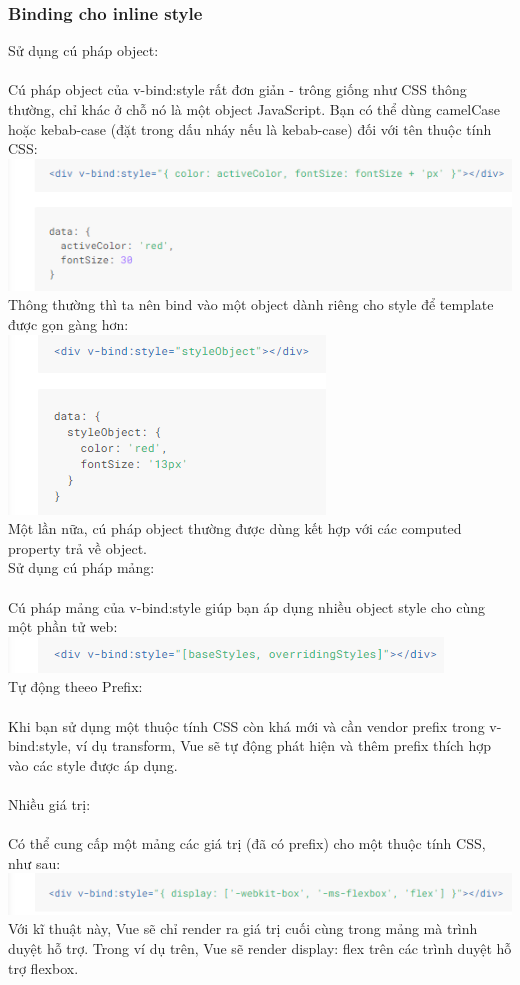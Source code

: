 \documentclass[12pt,a4paper]{report}
\begin{document}
\subsubsection{Binding cho inline style}
Sử dụng cú pháp object: \\\\Cú pháp object của v-bind:style rất đơn giản - trông giống như CSS thông thường, chỉ khác ở chỗ nó là một object JavaScript. Bạn có thể dùng camelCase hoặc kebab-case (đặt trong dấu nháy nếu là kebab-case) đối với tên thuộc tính CSS:\\\includegraphics[scale=1]{31}\\
Thông thường thì ta nên bind vào một object dành riêng cho style để template được gọn gàng hơn: \\\includegraphics[scale=1]{32}\\Một lần nữa, cú pháp object thường được dùng kết hợp với các computed property trả về object.\\Sử dụng cú pháp mảng:\\\\Cú pháp mảng của v-bind:style giúp bạn áp dụng nhiều object style cho cùng một phần tử web:\\\includegraphics[scale=1]{33}\\ Tự động theeo Prefix:\\\\Khi bạn sử dụng một thuộc tính CSS còn khá mới và cần vendor prefix trong v-bind:style, ví dụ transform, Vue sẽ tự động phát hiện và thêm prefix thích hợp vào các style được áp dụng.\\\\Nhiều giá trị: \\\\Có thể cung cấp một mảng các giá trị (đã có prefix) cho một thuộc tính CSS, như sau:\\\includegraphics[scale=1]{34}\\Với kĩ thuật này, Vue sẽ chỉ render ra giá trị cuối cùng trong mảng mà trình duyệt hỗ trợ. Trong ví dụ trên, Vue sẽ render display: flex trên các trình duyệt hỗ trợ flexbox.
\end{document}
